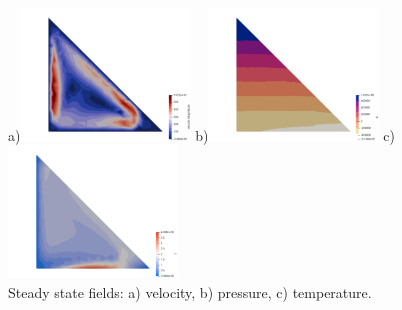 \begin{center}
a)\includegraphics[width=4.5cm]{python_codes/fieldstone_51/images/vel}
b)\includegraphics[width=4.5cm]{python_codes/fieldstone_51/images/press}
c)\includegraphics[width=4.5cm]{python_codes/fieldstone_51/images/temp}\\
{\small Steady state fields: a) velocity, b) pressure, c) temperature.}
\end{center}




